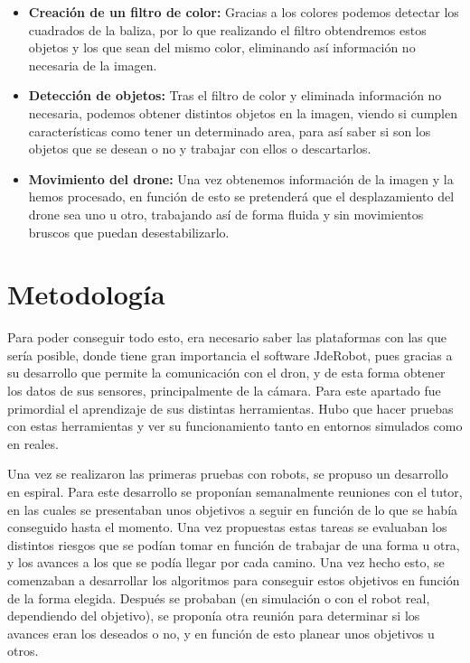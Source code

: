 \begin{itemize}
	\item \textbf{Creaci\'on de un filtro de color:} Gracias a los colores podemos detectar los cuadrados de la baliza, por lo que realizando el filtro obtendremos estos objetos y los que sean del mismo color, eliminando as\'i informaci\'on no necesaria de la imagen.
	
	\item \textbf{Detecci\'on de objetos: } Tras el filtro de color y eliminada informaci\'on no necesaria, podemos obtener distintos objetos en la imagen, viendo si cumplen caracter\'isticas como tener un determinado area, para as\'i saber si son los objetos que se desean o no y trabajar con ellos o descartarlos. 
	
	\item \textbf{Movimiento del drone: } Una vez obtenemos informaci\'on de la imagen y la hemos procesado, en funci\'on de esto se pretender\'a que el desplazamiento del drone sea uno u otro, trabajando as\'i de forma fluida y sin movimientos bruscos que puedan desestabilizarlo.   

\end{itemize}


\section{Metodolog\'ia}
\hspace{1 cm} Para poder conseguir todo esto, era necesario saber las plataformas con las que ser\'ia posible, donde tiene gran importancia el software JdeRobot, pues gracias a su desarrollo que permite la comunicaci\'on con el dron, y de esta forma obtener los datos de sus sensores, principalmente de la c\'amara. Para este apartado fue primordial el aprendizaje de sus distintas herramientas. Hubo que hacer pruebas con estas herramientas y ver su funcionamiento tanto en entornos simulados como en reales.

\hspace{1 cm}Una vez se realizaron las primeras pruebas con robots, se propuso un desarrollo en espiral. Para este desarrollo se propon\'ian semanalmente reuniones con el tutor, en las cuales se presentaban unos objetivos a seguir en funci\'on de lo que se hab\'ia conseguido hasta el momento. Una vez propuestas estas tareas se evaluaban los distintos riesgos que se pod\'ian tomar en funci\'on de trabajar de una forma u otra, y los avances a los que se pod\'ia llegar por cada camino. Una vez hecho esto, se comenzaban a desarrollar los algoritmos para conseguir estos objetivos en funci\'on de la forma elegida. Despu\'es se probaban (en simulaci\'on o con el robot real, dependiendo del objetivo), se propon\'ia otra reuni\'on para determinar si los avances eran los deseados o no, y en funci\'on de esto planear unos objetivos u otros.  

